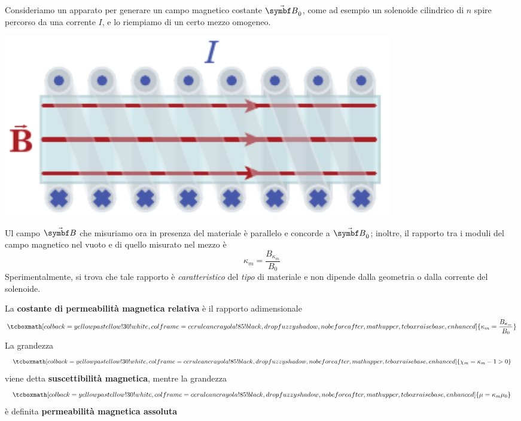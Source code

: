 \noindent Consideriamo un apparato per generare un campo magnetico costante $\vba{B}_0$, come ad esempio un solenoide cilindrico di $n$ spire percorso da una corrente $I$, e lo riempiamo di un certo mezzo omogeneo.
\begin{center}
	\includegraphics[width=0.75\textwidth]{images/chp12/chp12solenoideriempito1.pdf}
\end{center}
Ul campo $\vba{B}$ che misuriamo ora in presenza del materiale è parallelo e concorde a $\vba{B}_0$; inoltre, il rapporto tra i moduli del campo magnetico nel vuoto e di quello misurato nel mezzo è
\begin{equation*}
	\kappa_m=\frac{B_{\kappa_m}}{B_0}
\end{equation*}
Sperimentalmente, si trova che tale rapporto è \textit{caratteristico} del \textit{tipo} di materiale e non dipende dalla geometria o dalla corrente del solenoide.
\begin{define}
	La \textbf{costante di permeabilità magnetica relativa} è il rapporto adimensionale
	\begin{equation}
		\tcboxmath[colback=yellowpastellow!30!white,colframe=ceruleancrayola!85!black,drop fuzzy shadow, nobeforeafter, math upper, tcbox raise base, enhanced]{\kappa_m=\frac{B_{\kappa_m}}{B_0}}\label{CostantePermRelativaDef}
	\end{equation}
	La grandezza
	\begin{equation}
		\tcboxmath[colback=yellowpastellow!30!white,colframe=ceruleancrayola!85!black,drop fuzzy shadow, nobeforeafter, math upper, tcbox raise base, enhanced]{\chi_m=\kappa_m - 1>0}
	\end{equation}
	viene detta \textbf{suscettibilità magnetica}, mentre la grandezza
	\begin{equation}
		\tcboxmath[colback=yellowpastellow!30!white,colframe=ceruleancrayola!85!black,drop fuzzy shadow, nobeforeafter, math upper, tcbox raise base, enhanced]{\mu=\kappa_m\mu_0}
	\end{equation}
	è definita \textbf{permeabilità magnetica assoluta}
\end{define}
